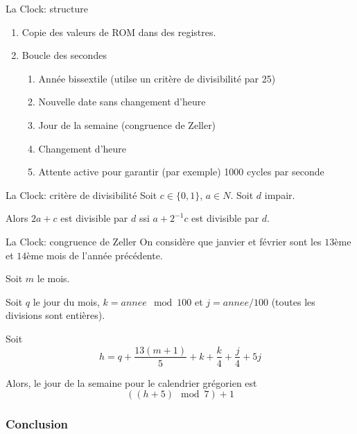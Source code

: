 \documentclass[12pt]{beamer}
\begin{document}
\begin{frame}{La Clock: structure}
    \begin{enumerate}
        \item Copie des valeurs de ROM dans des registres.
        \item Boucle des secondes
        \begin{enumerate}
            \item Année bissextile (utilse un critère de divisibilité par 25)
            \item Nouvelle date sans changement d'heure
            \item Jour de la semaine (congruence de Zeller)
            \item Changement d'heure
            \item Attente active pour garantir (par exemple) 1000 cycles par seconde
        \end{enumerate}
    \end{enumerate}
\end{frame}

\begin{frame}{La Clock: critère de divisibilité}
    Soit $c \in \{0, 1\}$, $a\in N$. Soit $d$ impair.

    Alors $2a+c$ est divisible par $d$ ssi $a+2^{-1}c$ est divisible par $d$.
\end{frame}


\begin{frame}{La Clock: congruence de Zeller}
On considère que janvier et février sont les $13$ème et $14$ème mois de l'année précédente. 

Soit $m$ le mois. 

Soit $q$ le jour du mois, $k = annee \mod 100$ et $j = annee/100$ (toutes les divisions sont entières).

Soit $$h = q + \frac{13(m+1)}{5}+k+\frac{k}{4}+\frac{j}{4}+5j$$

Alors, le jour de la semaine pour le calendrier grégorien est $$((h+5)\mod 7 )+1$$
\end{frame}

\begin{frame}
\frametitle{Conclusion}
\begin{itemize}

\end{itemize}
\end{frame}
\end{document}

